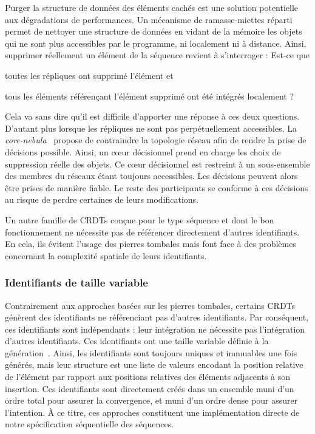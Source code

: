 Purger la structure de données des éléments cachés est une solution potentielle
aux dégradations de performances. Un mécanisme de ramasse-miettes
réparti~\cite{abdullahi1998garbage} permet de nettoyer une structure de données
en vidant de la mémoire les objets qui ne sont plus accessibles par le
programme, ni localement ni à distance. Ainsi, supprimer réellement un élément
de la séquence revient à s'interroger : \og Est-ce que
\begin{inparaenum}[(i)]
\item toutes les répliques ont supprimé l'élément et
\item tous les éléments référençant l'élément supprimé ont été intégrés
  localement ?
\end{inparaenum}\fg Cela va sans dire qu'il est difficile d'apporter une réponse
à ces deux questions. D'autant plus lorsque les répliques ne sont pas
perpétuellement accessibles. La \emph{core-nebula}~\cite{letia2009crdts} propose
de contraindre la topologie réseau afin de rendre la prise de décisions
possible. Ainsi, un cœur décisionnel prend en charge les choix de suppression
réelle des objets.  Ce cœur décisionnel est restreint à un sous-ensemble des
membres du réseaux étant toujours accessibles. Les décisions peuvent alors être
prises de manière fiable. Le reste des participants se conforme à ces décisions
au risque de perdre certaines de leurs modifications.
 
Un autre famille de CRDTs conçue pour le type séquence et dont le bon
fonctionnement ne nécessite pas de référencer directement d'autres
identifiants. En cela, ils évitent l'usage des pierres tombales mais font face à
des problèmes concernant la complexité spatiale de leurs identifiants.

\subsubsection{Identifiants de taille variable}

Contrairement aux approches basées sur les pierres tombales, certains CRDTs
génèrent des identifiants ne référenciant pas d'autres identifiants. Par
conséquent, ces identifiants sont indépendants : leur intégration ne nécessite
pas l'intégration d'autres identifiants. Ces identifiants ont une taille
variable définie à la génération~\cite{andre2013supporting,
  preguica2009commutative, weiss2009logoot}.  Ainsi, les identifiants sont
toujours uniques et immuables une fois générés, mais leur structure est une
liste de valeurs encodant la position relative de l'élément par rapport aux
positions relatives des éléments adjacents à son insertion. Ces identifiants
sont directement créés dans un ensemble muni d'un ordre total pour assurer la
convergence, et muni d'un ordre dense pour assurer l'intention. À ce titre, ces
approches constituent une implémentation directe de notre spécification
séquentielle des séquences.

